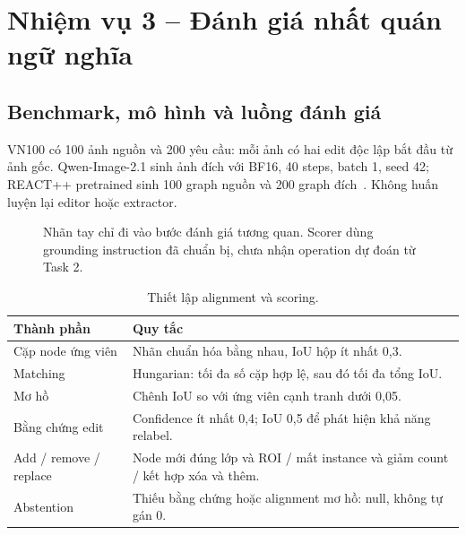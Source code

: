 
\section{Nhiệm vụ 3 -- Đánh giá nhất quán ngữ nghĩa}
\subsection{Benchmark, mô hình và luồng đánh giá}
VN100 có 100 ảnh nguồn và 200 yêu cầu: mỗi ảnh có hai edit độc lập bắt đầu từ
ảnh gốc. Qwen-Image-2.1 sinh ảnh đích với BF16, 40 steps, batch 1, seed 42;
REACT++ pretrained sinh 100 graph nguồn và 200 graph đích~\cite{qwenimage21,reactplusplus}.
Không huấn luyện lại editor hoặc extractor.

\begin{figure}[!t]\centering
{}
\caption{Nhãn tay chỉ đi vào bước đánh giá tương quan. Scorer dùng grounding
instruction đã chuẩn bị, chưa nhận operation dự đoán từ Task 2.}
\end{figure}

\begin{table}[!ht]\centering\small
\caption{Thiết lập alignment và scoring.}
\begin{tabularx}{\linewidth}{@{}p{24mm}X@{}}\toprule
Thành phần & Quy tắc\\\midrule
Cặp node ứng viên & Nhãn chuẩn hóa bằng nhau, IoU hộp ít nhất 0,3.\\
Matching & Hungarian: tối đa số cặp hợp lệ, sau đó tối đa tổng IoU.\\
Mơ hồ & Chênh IoU so với ứng viên cạnh tranh dưới 0,05.\\
Bằng chứng edit & Confidence ít nhất 0,4; IoU 0,5 để phát hiện khả năng relabel.\\
Add / remove / replace & Node mới đúng lớp và ROI / mất instance và giảm count / kết hợp xóa và thêm.\\
Abstention & Thiếu bằng chứng hoặc alignment mơ hồ: null, không tự gán 0.\\
\bottomrule\end{tabularx}\end{table}

